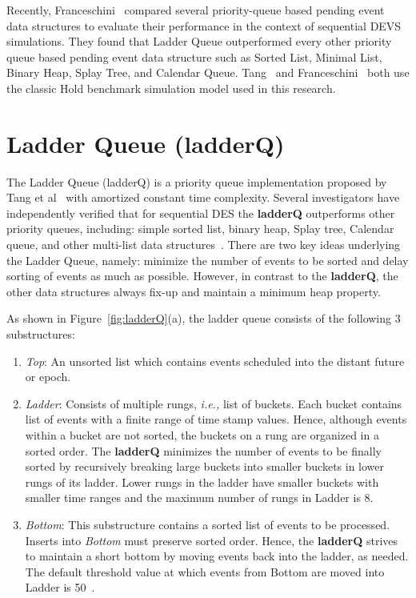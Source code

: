 Recently, Franceschini~\cite{franceschini-15} compared several
priority-queue based pending event data structures to evaluate their
performance in the context of sequential DEVS simulations. They found
that Ladder Queue outperformed every other priority queue based
pending event data structure such as Sorted List, Minimal List, Binary
Heap, Splay Tree, and Calendar Queue. Tang~\cite{tang-05} and
Franceschini~\cite{franceschini-15} both use the classic Hold
benchmark simulation model used in this research.

\section{Ladder Queue (ladderQ)}\label{sec:ladderQ}

The Ladder Queue (ladderQ) is a priority queue implementation proposed
by Tang et al~\cite{tang-05} with amortized constant time complexity.
Several investigators have independently verified that for sequential
DES the \textbf{ladderQ} outperforms other priority queues, including:
simple sorted list, binary heap, Splay tree, Calendar queue, and other
multi-list data
structures~\cite{dickman-13,franceschini-15,tang-05}. There are two
key ideas underlying the Ladder Queue, namely: minimize the number of
events to be sorted and delay sorting of events as much as possible.
However, in contrast to the \textbf{ladderQ}, the other data
structures always fix-up and maintain a minimum heap property.

As shown in Figure~\ref{fig:ladderQ}(a), the ladder queue consists of
the following 3 substructures:

\begin{enumerate}[leftmargin=*,topsep=0pt]

\item \emph{Top}: An unsorted list which contains events scheduled
  into the distant future or epoch.

\item \emph{Ladder}: Consists of multiple rungs, \textit{i.e.,} list
  of buckets. Each bucket contains list of events with a finite range
  of time stamp values. Hence, although events within a bucket are not
  sorted, the buckets on a rung are organized in a sorted order. The
  \textbf{ladderQ} minimizes the number of events to be finally sorted
  by recursively breaking large buckets into smaller buckets in lower
  rungs of its ladder. Lower rungs in the ladder have smaller buckets
  with smaller time ranges and the maximum number of rungs in Ladder
  is 8.

\item \emph{Bottom}: This substructure contains a sorted list of
  events to be processed. Inserts into \emph{Bottom} must preserve
  sorted order. Hence, the \textbf{ladderQ} strives to maintain a
  short bottom by moving events back into the ladder, as needed. The
  default threshold value at which events from Bottom are moved into
  Ladder is 50~\cite{tang-05}.

\end{enumerate}

